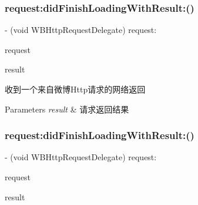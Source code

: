 \subsubsection{\texorpdfstring{request\+:did\+Finish\+Loading\+With\+Result\+:()}{request:didFinishLoadingWithResult:()}\hspace{0.1cm}{\footnotesize\ttfamily [2/3]}}
{\footnotesize\ttfamily -\/ (void W\+B\+Http\+Request\+Delegate) request\+: \begin{DoxyParamCaption}\item[{(\mbox{\hyperlink{interface_w_b_http_request}{W\+B\+Http\+Request}} $\ast$)}]{request }\item[{didFinishLoadingWithResult:(N\+S\+String $\ast$)}]{result }\end{DoxyParamCaption}\hspace{0.3cm}{\ttfamily [optional]}}

收到一个来自微博\+Http请求的网络返回


\begin{DoxyParams}{Parameters}
{\em result} & 请求返回结果 \\
\hline
\end{DoxyParams}
\mbox{\label{protocol_w_b_http_request_delegate_01-p_af87fe20c34dd9d1ae9a131eea9cec654}} 
\subsubsection{\texorpdfstring{request\+:did\+Finish\+Loading\+With\+Result\+:()}{request:didFinishLoadingWithResult:()}\hspace{0.1cm}{\footnotesize\ttfamily [3/3]}}
{\footnotesize\ttfamily -\/ (void W\+B\+Http\+Request\+Delegate) request\+: \begin{DoxyParamCaption}\item[{(\mbox{\hyperlink{interface_w_b_http_request}{W\+B\+Http\+Request}} $\ast$)}]{request }\item[{didFinishLoadingWithResult:(N\+S\+String $\ast$)}]{result }\end{DoxyParamCaption}\hspace{0.3cm}{\ttfamily [optional]}}

